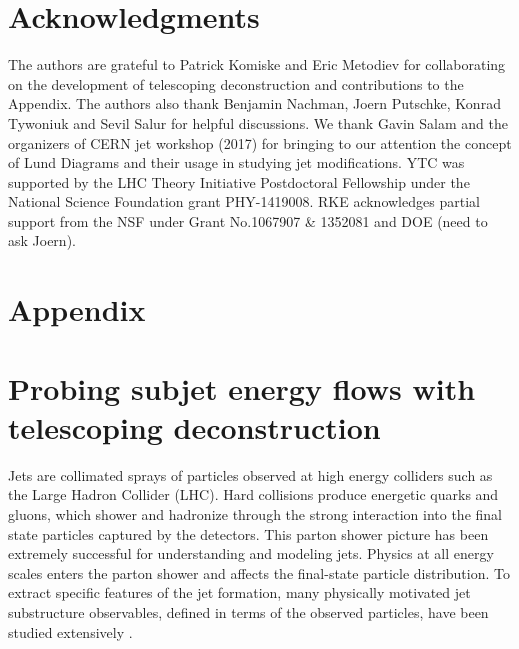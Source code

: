 \documentclass[notoc]{JHEP3}
\begin{document}
\section*{Acknowledgments}
The authors are grateful to Patrick Komiske and Eric Metodiev for collaborating on the development of telescoping deconstruction and contributions to the Appendix. The authors also thank Benjamin Nachman, Joern Putschke, Konrad Tywoniuk and Sevil Salur for helpful discussions. We thank Gavin Salam and the organizers of CERN jet workshop (2017) for bringing to our attention the concept of Lund Diagrams and their usage in studying jet modifications. YTC was supported by the LHC Theory Initiative Postdoctoral Fellowship under the National Science Foundation grant PHY-1419008. RKE acknowledges partial support from the NSF under Grant No.1067907 \& 1352081 and DOE (need to ask Joern). 

























\newpage
\appendix
\section*{Appendix}
\section{Probing subjet energy flows with telescoping deconstruction}

Jets are collimated sprays of particles observed at high energy colliders such as the Large Hadron Collider (LHC). Hard collisions produce energetic quarks and gluons, which shower and hadronize through the strong interaction into the final state particles captured by the detectors. This parton shower picture has been extremely successful for understanding and modeling jets. Physics at all energy scales enters the parton shower and affects the final-state particle distribution. To extract specific features of the jet formation, many physically motivated jet substructure observables, defined in terms of the observed particles, have been studied extensively \cite{Abdesselam:2010pt,Altheimer:2012mn,Altheimer:2013yza,Adams:2015hiv,Larkoski:2017jix,ATLAS-CONF-2017-064,Khachatryan:1955546}.
\end{document}
